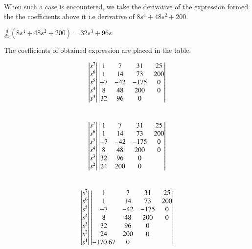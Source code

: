 When such a case is encountered, we take the derivative of the expression formed the the coefficients above it i.e derivative of $8s^4 + 48s^2 +200$.
\begin{center}
    $\frac{d}{dx}(8s^4 + 48s^2 +200) = 32s^3 + 96s$
\end{center}

The coefficients of obtained expression are placed in the table.

\begin{align}
\begin{vmatrix}s^7\\s^6\\s^5\\s^4\\s^3\end{vmatrix}
\begin{vmatrix}1 & 7 & 31 & 25 \\ 1 & 14 & 73 & 200 \\ -7 & -42 & -175 & 0 \\ 8 & 48 & 200 & 0 \\ 32 & 96 & 0 &  \end{vmatrix}
\end{align}\\
\begin{align}
\begin{vmatrix}s^7\\s^6\\s^5\\s^4\\s^3\\s^2\end{vmatrix}
\begin{vmatrix}1 & 7 & 31 & 25 \\ 1 & 14 & 73 & 200 \\ -7 & -42 & -175 & 0 \\ 8 & 48 & 200 & 0 \\ 32 & 96 & 0 &  \\ 24 & 200 & 0 &  \end{vmatrix}
\end{align}\\
\begin{align}
\begin{vmatrix}s^7\\s^6\\s^5\\s^4\\s^3\\s^2\\s^1\end{vmatrix}
\begin{vmatrix}1 & 7 & 31 & 25 \\ 1 & 14 & 73 & 200 \\ -7 & -42 & -175 & 0 \\ 8 & 48 & 200 & 0 \\ 32 & 96 & 0 &  \\ 24 & 200 & 0 &  \\ -170.67 & 0 &  & \end{vmatrix}
\end{align}\\
